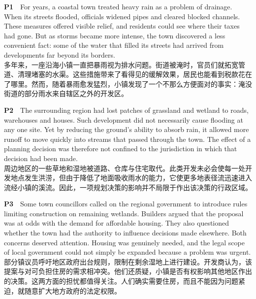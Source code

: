 \documentclass[a4paper,11pt,openany]{report}
\newcommand{\zhline}[1]{{\CJKsf\color{bodygrey}#1}}
\begin{document}
\begin{samepage}
\textbf{P1}　For years, a coastal town treated heavy rain as a problem of drainage. When its streets flooded, officials widened pipes and cleared blocked channels. These measures offered visible relief, and residents could see where their taxes had gone. But as storms became more intense, the town discovered a less convenient fact: some of the water that filled its streets had arrived from developments far beyond its borders.\\
\zhline{多年来，一座沿海小镇一直把暴雨视为排水问题。街道被淹时，官员们就拓宽管道、清理堵塞的水渠。这些措施带来了看得见的缓解效果，居民也能看到税款花在了哪里。然而，随着暴雨愈发猛烈，小镇发现了一个不那么方便面对的事实：淹没街道的部分雨水来自辖区之外的开发区。}
\par\end{samepage}

\begin{samepage}
\textbf{P2}　The surrounding region had lost patches of grassland and wetland to roads, warehouses and houses. Such development did not necessarily cause flooding at any one site. Yet by reducing the ground's ability to absorb rain, it allowed more runoff to move quickly into streams that passed through the town. The effect of a planning decision was therefore not confined to the jurisdiction in which that decision had been made.\\
\zhline{周边地区的一些草地和湿地被道路、仓库与住宅取代。此类开发未必会使每一处开发地点发生洪涝，但由于降低了地面吸收雨水的能力，它使更多地表径流迅速进入流经小镇的溪流。因此，一项规划决策的影响并不局限于作出该决策的行政区域。}
\par\end{samepage}

\begin{samepage}
\textbf{P3}　Some town councillors called on the regional government to introduce rules limiting construction on remaining wetlands. Builders argued that the proposal was at odds with the demand for affordable housing. They also questioned whether the town had the authority to influence decisions made elsewhere. Both concerns deserved attention. Housing was genuinely needed, and the legal scope of local government could not simply be expanded because a problem was urgent.\\
\zhline{部分镇议员呼吁地区政府出台规则，限制在剩余湿地上进行建设。开发商认为，该提案与对可负担住房的需求相冲突。他们还质疑，小镇是否有权影响其他地区作出的决策。这两方面的担忧都值得关注。人们确实需要住房，而且不能因为问题紧迫，就随意扩大地方政府的法定权限。}
\par\end{samepage}
\end{document}
